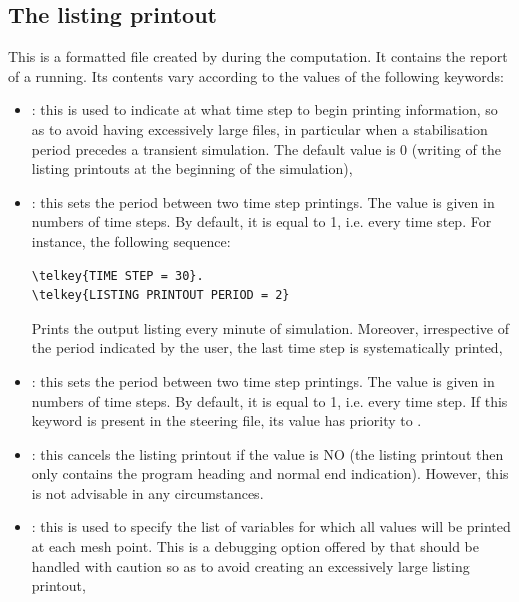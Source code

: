 \subsection{The listing printout}

This is a formatted file created by  during the computation.
It contains the report of a  running.
Its contents vary according to the values of the following keywords:

\begin{itemize}

\item {}:
this is used to indicate at what time step to begin printing information,
so as to avoid having excessively large files,
in particular when a stabilisation period precedes a transient simulation.
The default value is 0 (writing of the listing printouts at the
beginning of the simulation),

\item {}:
this sets the period between two time step printings.
The value is given in numbers of time steps.
By default, it is equal to 1, i.e. every time step.
For instance, the following sequence:

\begin{lstlisting}[language=TelemacCas]
\telkey{TIME STEP = 30}.
\telkey{LISTING PRINTOUT PERIOD = 2}
\end{lstlisting}

Prints the output listing every minute of simulation.
Moreover, irrespective of the period indicated by the user,
the last time step is systematically printed,

\item {}:
this sets the period between two time step printings.
The value is given in numbers of time steps.
By default, it is equal to 1, i.e. every time step.
If this keyword is present in the steering file,
its value has priority to .

\item {}:
this cancels the listing printout if the value is NO
(the listing printout then only contains the program heading and normal end
indication).
However, this is not advisable in any circumstances.

\item {}:
this is used to specify the list of variables for which all values
will be printed at each mesh point.
This is a debugging option offered by  that should be handled
with caution so as to avoid creating an excessively large listing printout,


\end{itemize}
